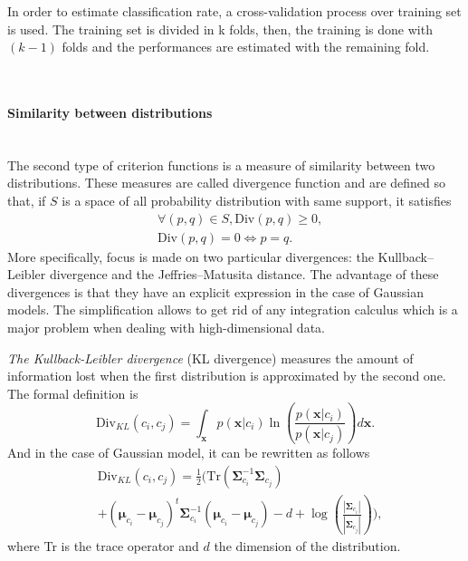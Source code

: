 \documentclass[journal,peerreview,onecolumn]{IEEEtran}
\begin{document}
            In order to estimate classification rate, a cross-validation process over training set is used\cite{opac-b1127878}. The training set is divided in k folds, then, the training is done with $(k-1)$ folds and the performances are estimated with the remaining fold.

            \hspace{0pt} \\

            \paragraph{Similarity between distributions}

            \hspace{0pt} \\
            The second type of criterion functions is a measure of similarity between two distributions. These measures are called divergence function and are defined so that, if $S$ is a space of all probability distribution with same support, it satisfies
            \begin{align*}
                &\forall (p,q) \in S, \text{Div}(p,q) \geq 0, \\
                &\text{Div}(p,q) = 0 \Leftrightarrow p = q.
            \end{align*}
            More specifically, focus is made on two particular divergences: the Kullback–Leibler divergence and the Jeffries–Matusita distance. The advantage of these divergences is that they have an explicit expression in the case of Gaussian models. The simplification allows to get rid of any integration calculus which is a major problem when dealing with high-dimensional data.


            \emph{The Kullback-Leibler divergence} (KL divergence) measures the amount of information lost when the first distribution is approximated by the second one\cite{kullback1987letter}. The formal definition is
            \begin{equation}
                \text{Div}_{KL}(c_i,c_j) = \int_\mathbf{x} p(\mathbf{x}|c_i) \ln \left(\frac{p(\mathbf{x}|c_i)}{p(\mathbf{x}|c_j)}\right) d\mathbf{x}.
            \end{equation}
            And in the case of Gaussian model, it can be rewritten as follows
            \begin{align}
                &\text{Div}_{KL}(c_i,c_j) = \frac{1}{2} \biggl( \text{Tr} (\boldsymbol{\Sigma}_{c_i}^{-1} \boldsymbol{\Sigma}_{c_j}) \nonumber \\
                & + (\boldsymbol{\mu}_{c_i} - \boldsymbol{\mu}_{c_j})^t \boldsymbol{\Sigma}_{c_i}^{-1} (\boldsymbol{\mu}_{c_i} - \boldsymbol{\mu}_{c_j}) - d + \log \left( \frac{|\boldsymbol{\Sigma}_{c_i}|}{|\boldsymbol{\Sigma}_{c_j}|} \right) \biggr),
            \end{align}
            where Tr is the trace operator and $d$ the dimension of the distribution.
\end{document}
